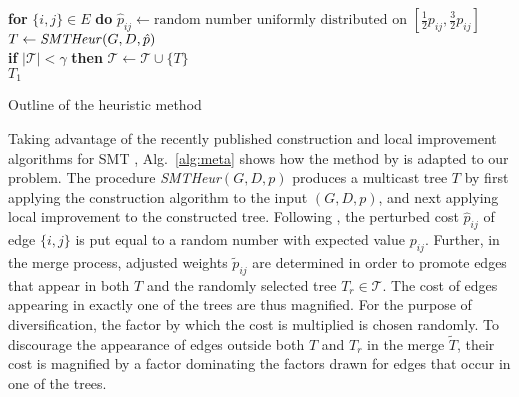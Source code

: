 \begin{algorithm}
 {
  \textbf{for} $\{i,j\}\in E$ \textbf{do} $\hat{p}_{ij}\leftarrow\text{random number uniformly distributed on
  $\left[\frac{1}{2}p_{ij},\frac{3}{2}p_{ij}\right]$}$\\
  $T\leftarrow\text{\textit{SMTHeur}$(G,D,\hat{p})$}$\\
  \textbf{if} $|\mathcal{T}|<\gamma$ \textbf{then} $\mathcal{T}\leftarrow \mathcal{T}\cup \{T\}$\\
}
\Return $T_1$

\caption{Outline of the heuristic method}
\label{alg:meta}
\end{algorithm}

Taking advantage of the recently published construction and local improvement algorithms for SMT \citep{ivanova16isco},
Alg.\ \ref{alg:meta} shows how the method by \citet{pajor18} is adapted to our problem.
The procedure \textit{SMTHeur}$(G,D,p)$ produces a multicast tree $T$ by first applying the construction algorithm to the input $(G,D,p)$,
and next applying local improvement to the constructed tree.
Following \citet{pajor18}, the perturbed cost $\hat{p}_{ij}$ of edge $\{i,j\}$ is put equal to a random number with expected value $p_{ij}$.
Further, in the merge process, adjusted weights $\tilde{p}_{ij}$ are determined in order to 
promote edges that appear in both $T$ and the randomly selected tree $T_r\in\mathcal{T}$. 
The cost of edges appearing in exactly one of the trees are thus magnified.
For the purpose of diversification, the factor by which the cost is multiplied is chosen randomly.
To discourage the appearance of edges outside both $T$ and $T_r$ in the merge $\tilde{T}$,
their cost is magnified by a factor dominating the factors drawn for edges that occur in one of the trees.


